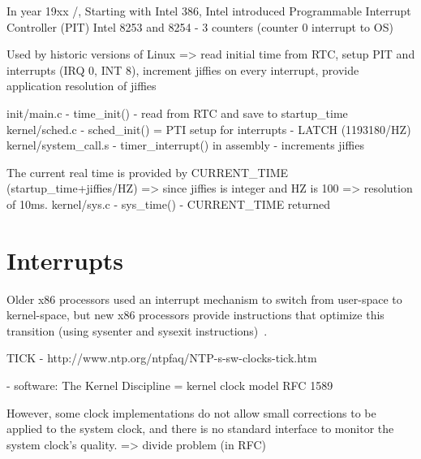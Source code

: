 In year 19xx /, Starting with Intel 386,
Intel introduced
Programmable Interrupt Controller (PIT) Intel 8253 and 8254 - 3 counters (counter 0 interrupt to OS)


Used by historic versions of Linux
=> read initial time from RTC, setup PIT and interrupts (IRQ 0, INT 8), increment jiffies on every interrupt, provide application resolution of jiffies

init/main.c - time\_init() - read from RTC and save to startup\_time
kernel/sched.c - sched\_init() = PTI setup for interrupts - LATCH (1193180/HZ)
kernel/system\_call.s - timer\_interrupt() in assembly - increments jiffies

The current real time is provided by CURRENT\_TIME (startup\_time+jiffies/HZ) => since jiffies is integer and HZ is 100 => resolution of 10ms.
kernel/sys.c - sys\_time() - CURRENT\_TIME returned


\section{Interrupts}
Older x86 processors used an interrupt mechanism to switch from
user-space to kernel-space, but new x86 processors provide instructions
that optimize this transition (using sysenter and sysexit instructions)~\cite{ibm-linux-system-calls}.


TICK - http://www.ntp.org/ntpfaq/NTP-s-sw-clocks-tick.htm


- software:
The Kernel Discipline =  kernel clock model RFC 1589

However, some clock implementations do not allow small corrections to be applied to the system clock, and there is no standard interface to monitor the system clock's quality.
=> divide problem (in RFC)
